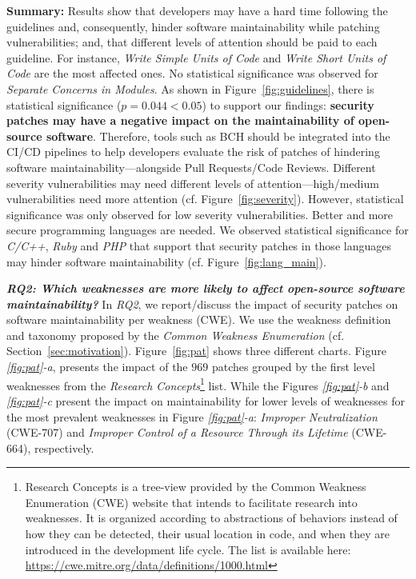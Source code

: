 \documentclass[smallextended]{svjour3}       %
\begin{document}
\textbf{Summary:} Results show that developers may have a
hard time following the guidelines and, consequently, hinder
software maintainability while patching vulnerabilities; and, that different levels of
attention should be paid to each guideline. For instance,
\emph{Write Simple Units of Code} and \emph{Write Short Units of Code}
are the most affected ones. No statistical significance was observed
for \emph{Separate Concerns in Modules}.
As shown in Figure~\ref{fig:guidelines}, there is statistical significance ($p=0.044 < 0.05$) to support our findings: \textbf{security patches
may have a negative impact on the maintainability of open-source software}. Therefore, tools such as BCH should be integrated into the CI/CD pipelines
to help developers evaluate the risk of patches of hindering software maintainability---alongside
Pull Requests/Code Reviews. Different severity
vulnerabilities may need different levels of attention---high/medium vulnerabilities need more attention (cf. Figure~\ref{fig:severity}). However, statistical significance was only observed for low severity vulnerabilities. Better and more secure programming languages are needed. We observed statistical significance for \emph{C/C++}, \emph{Ruby} and \emph{PHP} that support that security patches in those languages may hinder software maintainability (cf. Figure~\ref{fig:lang_main}).
%

\textit{\textbf{RQ2: Which weaknesses are more likely to
affect open-source software maintainability?}}
In \emph{RQ2}, we report/discuss the impact of security patches on
software maintainability per weakness (CWE). We use the weakness definition
and taxonomy proposed by the \emph{Common Weakness Enumeration} (cf. Section~\ref{sec:motivation}).
Figure~\ref{fig:pat} shows three different charts. Figure \emph{\ref{fig:pat}-a}, presents
the impact of the $969$ patches grouped by the first level weaknesses from
the \emph{Research Concepts}\footnote{Research Concepts 
 is a tree-view provided by the Common Weakness Enumeration (CWE) website 
 that intends to facilitate research into weaknesses. It is organized 
 according to 
 abstractions of behaviors instead of how they can be detected, 
 their usual location in code, and when they are introduced in the 
 development life cycle. The list is available here: \url{https://cwe.mitre.org/data/definitions/1000.html}
} list. While the Figures \emph{\ref{fig:pat}-b} and
\emph{\ref{fig:pat}-c} present the impact on maintainability for lower levels of 
weaknesses for the most prevalent weaknesses in Figure \emph{\ref{fig:pat}-a}:
\emph{Improper Neutralization} (CWE-707) 
and \emph{Improper Control of a Resource 
Through its Lifetime} (CWE-664), respectively.
\end{document}
